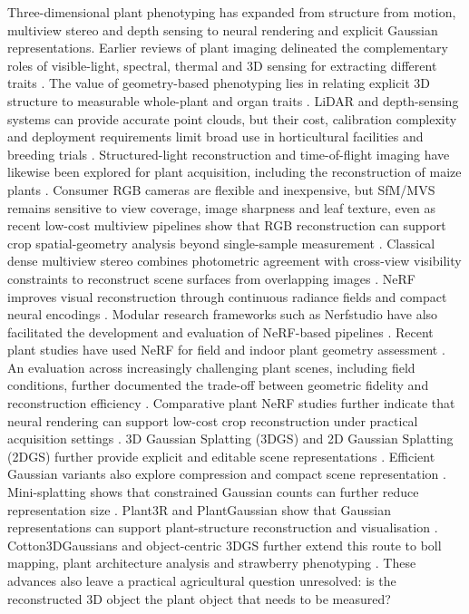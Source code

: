 \documentclass[a4paper]{cas-sc}
\begin{document}
Three-dimensional plant phenotyping has expanded from structure from motion, multiview stereo and depth sensing to neural rendering and explicit Gaussian representations. Earlier reviews of plant imaging delineated the complementary roles of visible-light, spectral, thermal and 3D sensing for extracting different traits \cite{ref4}. The value of geometry-based phenotyping lies in relating explicit 3D structure to measurable whole-plant and organ traits \cite{ref7}. LiDAR and depth-sensing systems can provide accurate point clouds, but their cost, calibration complexity and deployment requirements limit broad use in horticultural facilities and breeding trials \cite{ref14}. Structured-light reconstruction and time-of-flight imaging have likewise been explored for plant acquisition, including the reconstruction of maize plants \cite{ref13,ref15}. Consumer RGB cameras are flexible and inexpensive, but SfM/MVS remains sensitive to view coverage, image sharpness and leaf texture, even as recent low-cost multiview pipelines show that RGB reconstruction can support crop spatial-geometry analysis beyond single-sample measurement \cite{ref18,ref19}. Classical dense multiview stereo combines photometric agreement with cross-view visibility constraints to reconstruct scene surfaces from overlapping images \cite{ref17}. NeRF improves visual reconstruction through continuous radiance fields and compact neural encodings \cite{ref20,ref21,ref22}. Modular research frameworks such as Nerfstudio have also facilitated the development and evaluation of NeRF-based pipelines \cite{ref23}. Recent plant studies have used NeRF for field and indoor plant geometry assessment \cite{ref25,ref26}. An evaluation across increasingly challenging plant scenes, including field conditions, further documented the trade-off between geometric fidelity and reconstruction efficiency \cite{ref24}. Comparative plant NeRF studies further indicate that neural rendering can support low-cost crop reconstruction under practical acquisition settings \cite{ref59}. 3D Gaussian Splatting (3DGS) and 2D Gaussian Splatting (2DGS) further provide explicit and editable scene representations \cite{ref27,ref28}. Efficient Gaussian variants also explore compression and compact scene representation \cite{ref51,ref52,ref53}. Mini-splatting shows that constrained Gaussian counts can further reduce representation size \cite{ref54}. Plant3R and PlantGaussian show that Gaussian representations can support plant-structure reconstruction and visualisation \cite{ref30,ref31}. Cotton3DGaussians and object-centric 3DGS further extend this route to boll mapping, plant architecture analysis and strawberry phenotyping \cite{ref32,ref33}. These advances also leave a practical agricultural question unresolved: is the reconstructed 3D object the plant object that needs to be measured?
\end{document}
